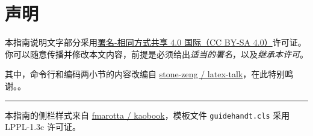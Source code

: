 \section{声明}
\label{sec:copyright}

\begin{widepar}
\begin{center}
  \vskip -1cm
  \faCreativeCommons\;
  \faCreativeCommonsBy\;
  \faCreativeCommonsSa
\end{center}

\bigskip

本指南说明文字部分采用\href{https://creativecommons.org/licenses/by-sa/4.0/deed.zh}{署名-相同方式共享 4.0 国际（CC BY-SA 4.0）}许可证。你可以随意传播并修改本文内容，前提是必须给出\emph{适当的署名}，以及\emph{继承本许可}。

\medskip

其中，命令行和编码两小节的内容改编自 \href{https://github.com/stone-zeng/latex-talk}{stone-zeng / latex-talk}，在此特别鸣谢。。

\smallskip

\begin{center}
  \rule{10cm}{1pt}
\end{center}

\bigskip

本指南的侧栏样式来自 \href{https://github.com/fmarotta/kaobook}{fmarotta / kaobook}，模板文件 \texttt{guidehandt.cls} 采用 LPPL-1.3c 许可证。

\end{widepar}

